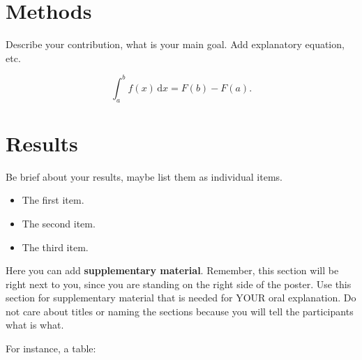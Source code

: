 \documentclass[a0paper,fleqn]{betterposter}
\begin{document}
{\section{Methods}

Describe your contribution, what is your main goal. Add explanatory equation, etc.

\begin{equation}
\int_a^b f(x)\,\mathrm{d}x = F(b)-F(a).
\end{equation}

\section{Results}

Be brief about your results, maybe list them as individual items. 

\begin{itemize}
\item The first item.
\item The second item.
\item The third item.
\end{itemize}





}{

Here you can add \textbf{supplementary material}. Remember, this section will be 
right next to you, since you are standing on the right side of the poster. 
Use this section for supplementary material that is needed for YOUR oral 
explanation. Do not care about titles or naming the sections because you will 
tell the participants what is what.


\vspace*{3.0em}

For instance, a table:


}
\end{document}

